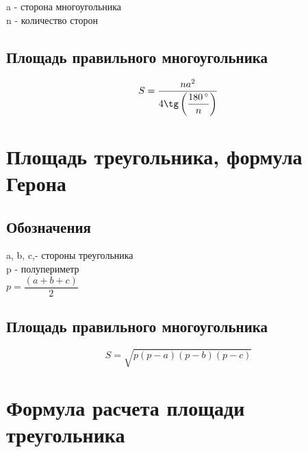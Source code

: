 \documentclass[a4paper,12pt]{article}
\begin{document}
a - сторона многоугольника \\
n - количество сторон

\subsection{Площадь правильного многоугольника}

\[ S = \frac{na^2}{4\tg \left(\dfrac{180\,^{\circ}}{n} \right)} \]

\newpage
\section{Площадь треугольника, формула Герона}

\begin{figure}[h]
\begin{center}
\end{center}
\end{figure}

\subsection{Обозначения}

a, b, c,- стороны треугольника \\[6pt]
p - полупериметр \\[6pt]
$p = \dfrac{( a + b + c)}{2}$

\subsection{Площадь правильного многоугольника}

\[ S = \sqrt{p(p - a)(p - b)(p - c)} \]

\newpage
\section{Формула расчета площади треугольника}
\end{document}
